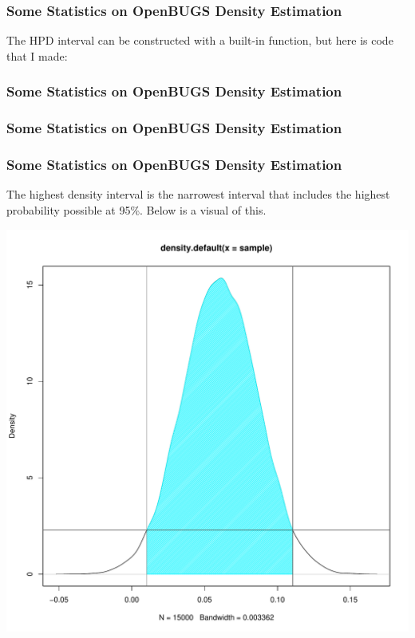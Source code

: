 \documentclass[10pt]{beamer}
\begin{document}
\begin{frame}
\frametitle{Some Statistics on OpenBUGS Density Estimation}
	The HPD interval can be constructed with a built-in function, but here is code that I made:
		
\end{frame}

\begin{frame}
\frametitle{Some Statistics on OpenBUGS Density Estimation}
	
\end{frame}

\begin{frame}
\frametitle{Some Statistics on OpenBUGS Density Estimation}
	
\end{frame}

\begin{frame}
\frametitle{Some Statistics on OpenBUGS Density Estimation}
	The highest density interval is the narrowest interval that includes the highest probability possible at 95\%. Below is a visual of this.
	\begin{center}
	\includegraphics[scale=0.3]{hdi.pdf} 
	\end{center}
\end{frame}
\end{document}
